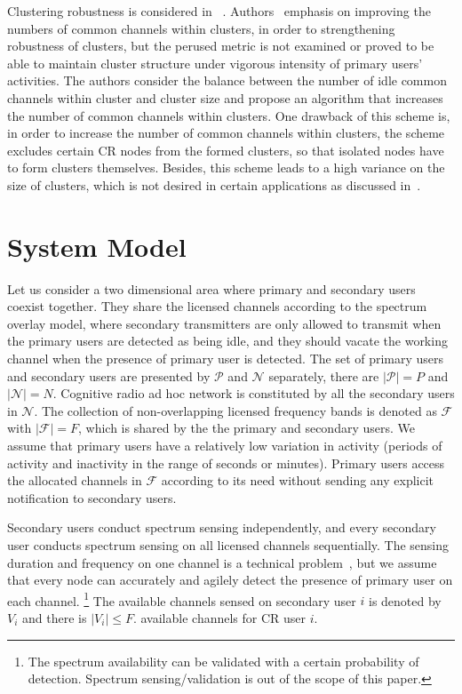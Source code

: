 \documentclass[journal,comsoc]{IEEEtran}
\theoremstyle{mytheoremstyle}
\theoremstyle{mytheoremstyle}
\theoremstyle{mytheoremstyle}
\begin{document}
Clustering robustness is considered in ~\cite{Lazos09, LIU_TMC11_2}.
Authors~\cite{Lazos09, LIU_TMC11_2} emphasis on improving the numbers of common channels within clusters, in order to strengthening robustness of clusters, but the perused metric is not examined or proved to be able to maintain cluster structure under vigorous intensity of primary users’ activities.
The authors consider the balance between the number of idle common channels within cluster and cluster size and propose an algorithm that increases the number of common channels within clusters. 
One drawback of this scheme is, in order to increase the number of common channels within clusters, the scheme excludes certain CR nodes from the formed clusters, so that isolated nodes have to form clusters themselves. 
Besides, this scheme leads to a high variance on the size of clusters, which is not desired in certain applications as discussed in~\cite{clustering_globecom11, cluster_EW10}.



\section{System Model}
\label{sec:model}
Let us consider a two dimensional area where primary and secondary users coexist together.
They share the licensed channels according to the spectrum overlay model, where secondary transmitters are only allowed to transmit when the primary users are detected as being idle, and they should vacate the working channel when the presence of primary user is detected.
The set of primary users and secondary users are presented by $\mathcal{P}$ and $\mathcal{N}$ separately, there are $|\mathcal{P}| = P$ and $|\mathcal{N}| = N$.
Cognitive radio ad hoc network is constituted by all the secondary users in $\mathcal{N}$.
The collection of non-overlapping licensed frequency bands is denoted as $\mathcal{F}$ with $|\mathcal{F}| =F$, which is shared by the the primary and secondary users.
We assume that primary users have a relatively low variation in activity (periods of activity and inactivity in the range of seconds or minutes).
%
Primary users access the allocated channels in $\mathcal{F}$ according to its need without sending any explicit notification to secondary users.

Secondary users conduct spectrum sensing independently, and every secondary user conducts spectrum sensing on all licensed channels sequentially.
The sensing duration and frequency on one channel is a technical problem~\cite{sensing_survey_2009}, but we assume that every node can accurately and agilely detect the presence of primary user on each channel. \footnote{The spectrum availability can be validated with a certain probability of detection. Spectrum sensing/validation is out of the scope of this paper.}
The available channels sensed on secondary user $i$ is denoted by $V_i$ and there is $\vert V_i \vert \leq F$. %
available channels for CR user $i$.
\end{document}
